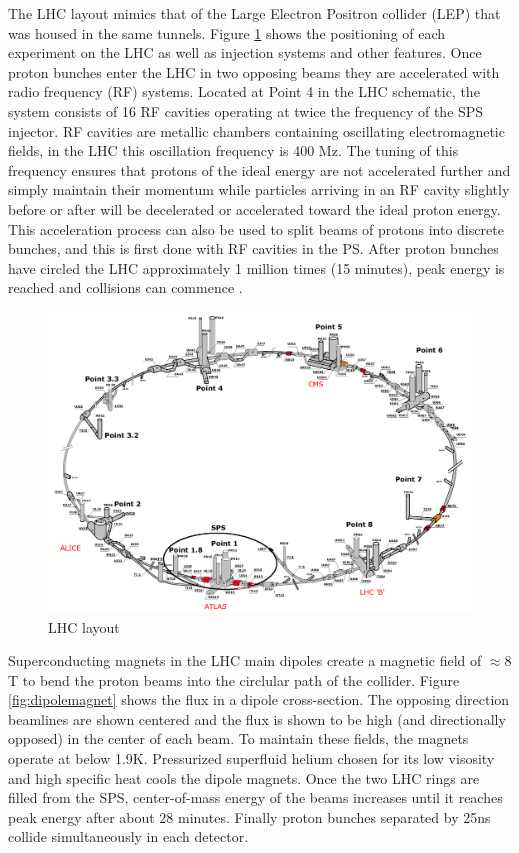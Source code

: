 The LHC layout mimics that of the Large Electron Positron collider (LEP) that was housed in the same tunnels. Figure \ref{fig:LHClayout} shows the positioning of each experiment on the LHC as well as injection systems and other features. Once proton bunches enter the LHC in two opposing beams they are accelerated with radio frequency (RF) systems. Located at Point 4 in the LHC schematic, the system consists of 16 RF cavities operating at twice the frequency of the SPS injector. RF cavities are metallic chambers containing oscillating electromagnetic fields, in the LHC this oscillation frequency is 400 Mz. The tuning of this frequency ensures that protons of the ideal energy are not accelerated further and simply maintain their momentum while particles arriving in an RF cavity slightly before or after will be decelerated or accelerated toward the ideal proton energy. This acceleration process can also be used to split beams of protons into discrete bunches, and this is first done with RF cavities in the PS. After proton bunches have circled the LHC approximately 1 million times (15 minutes), peak energy is reached and collisions can commence \cite{radiofrequency}.

\begin{figure}[!h]
        \centering
    \includegraphics[width=.6\textwidth]{Pictures/LHClayout.PNG}
    \caption{LHC layout \cite{LHCref}}
    \label{fig:LHClayout}
\end{figure}

Superconducting magnets in the LHC main dipoles create a magnetic field of $\approx 8$T to bend the proton beams into the circlular path of the collider. Figure \ref{fig:dipolemagnet} shows the flux in a dipole cross-section. The opposing direction beamlines are shown centered and the flux is shown to be high (and directionally opposed) in the center of each beam. To maintain these fields, the magnets operate at below 1.9K. Pressurized superfluid helium chosen for its low visosity and high specific heat cools the dipole magnets. Once the two LHC rings are filled from the SPS, center-of-mass energy of the beams increases until it reaches peak energy after about 28 minutes. Finally proton bunches separated by 25ns collide simultaneously in each detector.  

